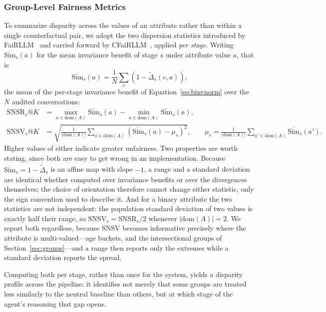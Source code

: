 \documentclass[manuscript,screen,review]{acmart}
\newcommand{\Dnorm}{\widetilde{\Delta}}
\newcommand{\SNSR}{\mathrm{SNSR}}
\newcommand{\SNSV}{\mathrm{SNSV}}
\newcommand{\Simbar}{\overline{\mathrm{Sim}}}
\newcommand{\dom}{\mathrm{dom}}
\begin{document}
\subsubsection{Group-Level Fairness Metrics}
\label{sec:groupmetrics}

To summarize disparity across the values of an attribute rather than within a
single counterfactual pair, we adopt the two dispersion statistics introduced by
FaiRLLM~\cite{fairllm} and carried forward by CFaiRLLM~\cite{cfairllm}, applied
\emph{per stage}. Writing $\Simbar_s(a)$ for the mean invariance benefit of stage
$s$ under attribute value $a$, that is
\begin{equation}
  \Simbar_s(a) = \frac{1}{N} \sum_{c} \left(1 - \Dnorm_s(c, a)\right),
  \label{eq:simbar}
\end{equation}
the mean of the per-stage invariance benefit of Equation~\eqref{eq:binvnorm} over
the $N$ audited conversations:
\begin{align}
  \SNSR_s@K &= \max_{a \in \dom(A)} \Simbar_s(a)
             - \min_{a \in \dom(A)} \Simbar_s(a),
  \label{eq:snsr}\\
  \SNSV_s@K &= \sqrt{\frac{1}{|\dom(A)|} \sum_{a \in \dom(A)}
               \left(\Simbar_s(a) - \mu_s\right)^2},
  \qquad
  \mu_s = \frac{1}{|\dom(A)|}\sum_{a' \in \dom(A)} \Simbar_s(a').
  \label{eq:snsv}
\end{align}
Higher values of either indicate greater unfairness. Two properties are worth
stating, since both are easy to get wrong in an implementation. Because
$\Simbar_s = 1 - \overline{\Dnorm}_s$ is an affine map with slope $-1$, a range and
a standard deviation are identical whether computed over invariance benefits or
over the divergences themselves; the choice of orientation therefore cannot change
either statistic, only the sign convention used to describe it. And for a binary
attribute the two statistics are not independent: the population standard deviation
of two values is exactly half their range, so $\SNSV_s = \SNSR_s/2$ whenever
$|\dom(A)| = 2$. We report both regardless, because $\SNSV$ becomes informative
precisely where the attribute is multi-valued---age buckets, and the
intersectional groups of Section~\ref{sec:groups}---and a range then reports only
the extremes while a standard deviation reports the spread.

Computing both per stage,
rather than once for the system, yields a disparity profile across the pipeline:
it identifies not merely that some groups are treated less similarly to the
neutral baseline than others, but at which stage of the agent's reasoning that gap
opens.
\end{document}
